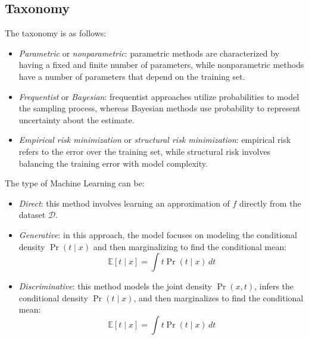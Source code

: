 \subsection{Taxonomy}
The taxonomy is as follows: 
\begin{itemize}
    \item \textit{Parametric} or \textit{nonparametric}: parametric methods are characterized by having a fixed and finite number of parameters, while nonparametric methods have a number of parameters that depend on the training set.
    \item \textit{Frequentist} or \textit{Bayesian}: frequentist approaches utilize probabilities to model the sampling process, whereas Bayesian methods use probability to represent uncertainty about the estimate.
    \item \textit{Empirical risk minimization} or \textit{structural risk minimization}: empirical risk refers to the error over the training set, while structural risk involves balancing the training error with model complexity.
\end{itemize}
The type of Machine Learning can be: 
\begin{itemize}
    \item \textit{Direct}: this method involves learning an approximation of $f$ directly from the dataset $\mathcal{D}$.
    \item \textit{Generative}: in this approach, the model focuses on modeling the conditional density $\Pr(t \mid x)$ and then marginalizing to find the conditional mean:
        \[\mathbb{E} \left[ t \mid x \right] = \int t \Pr(t \mid x)\, dt\]
    \item \textit{Discriminative}: this method models the joint density $\Pr(x,t)$, infers the conditional density $\Pr(t \mid x)$, and then marginalizes to find the conditional mean:
        \[\mathbb{E} \left[ t \mid x \right] = \int t \Pr(t \mid x)\, dt\]
\end{itemize}